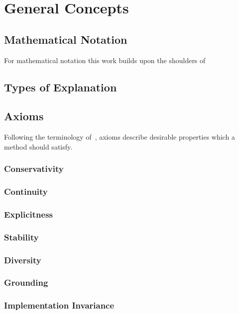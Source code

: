 \section{General Concepts}
\blindtext[3]

\subsection{Mathematical Notation}
For mathematical notation this work builds upon the shoulders of~\cite{Kindermans.2018}
\subsection{Types of Explanation}
\blindtext[3]

\subsection{Axioms}
Following the terminology of~\cite{Sundararajan.2017}, axioms describe desirable properties which a method should satisfy.

\subsubsection{Conservativity}
\blindtext[1]
\subsubsection{Continuity}
\blindtext[1]
\subsubsection{Explicitness}
\citeauthor{AlvarezMelis.2018}
\blindtext[1]
\subsubsection{Stability}
\citeauthor{AlvarezMelis.2018}
\blindtext[1]
\subsubsection{Diversity}
\citeauthor{AlvarezMelis.2018}
\blindtext[1]
\subsubsection{Grounding}
\citeauthor{AlvarezMelis.2018}
\blindtext[1]
\subsubsection{Implementation Invariance}
\blindtext[1]
